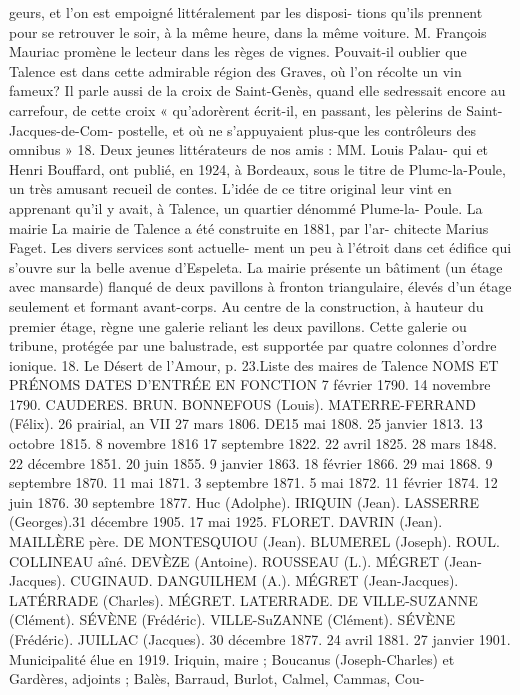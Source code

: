 \documentclass[a4paper,11pt]{book}
\begin{document}
geurs, et l'on est empoigné littéralement par les disposi-
tions qu'ils prennent pour se retrouver le soir, à la même
heure, dans la même voiture.
M. François Mauriac promène le lecteur dans les règes
de vignes. Pouvait-il oublier que Talence est dans cette
admirable région des Graves, où l'on récolte un vin fameux?
Il parle aussi de la croix de Saint-Genès, quand elle sedressait encore au carrefour, de cette croix « qu'adorèrent
écrit-il, en passant, les pèlerins de Saint-Jacques-de-Com-
postelle, et où ne s'appuyaient plus-que les contrôleurs des
omnibus » 18.
Deux jeunes littérateurs de nos amis : MM. Louis Palau-
qui et Henri Bouffard, ont publié, en 1924, à Bordeaux,
sous le titre de Plumc-la-Poule, un très amusant recueil de
contes. L'idée de ce titre original leur vint en apprenant
qu'il y avait, à Talence, un quartier dénommé Plume-la-
Poule.
La mairie
La mairie de Talence a été construite en 1881, par l'ar-
chitecte Marius Faget. Les divers services sont actuelle-
ment un peu à l'étroit dans cet édifice qui s'ouvre sur la
belle avenue d'Espeleta.
La mairie présente un bâtiment (un étage avec mansarde)
flanqué de deux pavillons à fronton triangulaire, élevés
d'un étage seulement et formant avant-corps. Au centre de
la construction, à hauteur du premier étage, règne une
galerie reliant les deux pavillons. Cette galerie ou tribune,
protégée par une balustrade, est supportée par quatre
colonnes d'ordre ionique.
18. Le Désert de l'Amour, p. 23.Liste des maires de Talence
NOMS ET PRÉNOMS
DATES D'ENTRÉE EN FONCTION
7 février 1790.
14 novembre 1790.
CAUDERES.
BRUN.
BONNEFOUS (Louis).
MATERRE-FERRAND (Félix).
26 prairial, an VII
27 mars 1806.
DE15 mai 1808.
25 janvier 1813.
13 octobre 1815.
8 novembre 1816
17 septembre 1822.
22 avril 1825.
28 mars 1848.
22 décembre 1851.
20 juin 1855.
9 janvier 1863.
18 février 1866.
29 mai 1868.
9 septembre 1870.
11 mai 1871.
3 septembre 1871.
5 mai 1872.
11 février 1874.
12 juin 1876.
30 septembre 1877.
Huc (Adolphe).
IRIQUIN (Jean).
LASSERRE (Georges).31 décembre 1905.
17 mai 1925.
FLORET.
DAVRIN (Jean).
MAILLÈRE père.
DE MONTESQUIOU (Jean).
BLUMEREL (Joseph).
ROUL.
COLLINEAU aîné.
DEVÈZE (Antoine).
ROUSSEAU (L.).
MÉGRET (Jean-Jacques).
CUGINAUD.
DANGUILHEM (A.).
MÉGRET (Jean-Jacques).
LATÉRRADE (Charles).
MÉGRET.
LATERRADE.
DE VILLE-SUZANNE (Clément).
SÉVÈNE (Frédéric).
VILLE-SuZANNE (Clément).
SÉVÈNE (Frédéric).
JUILLAC (Jacques).
30 décembre 1877.
24 avril 1881.
27 janvier 1901.
Municipalité élue en 1919.
Iriquin, maire ; Boucanus (Joseph-Charles) et Gardères,
adjoints ; Balès, Barraud, Burlot, Calmel, Cammas, Cou-
\end{document}
